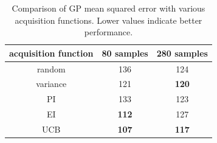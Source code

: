 \documentclass{sig-alternate}
\begin{document}

\begin{table}[tb]
\caption{Comparison of GP mean squared error with various acquisition functions. Lower values indicate better performance.}
\centering
\begin{tabular}{|c|c|c|}
\hline
acquisition function & 80 samples   & 280 samples  \\ \hline
random                                                        & 136          & 124          \\ \hline
variance                                                      & 121          & \textbf{120} \\ \hline
PI                                                            & 133          & 123          \\ \hline
EI                                                            & \textbf{112} & 127          \\ \hline
UCB                                                           & \textbf{107} & \textbf{117} \\ \hline
\end{tabular}
\label{tab:reg_res}
\end{table}
\end{document}
